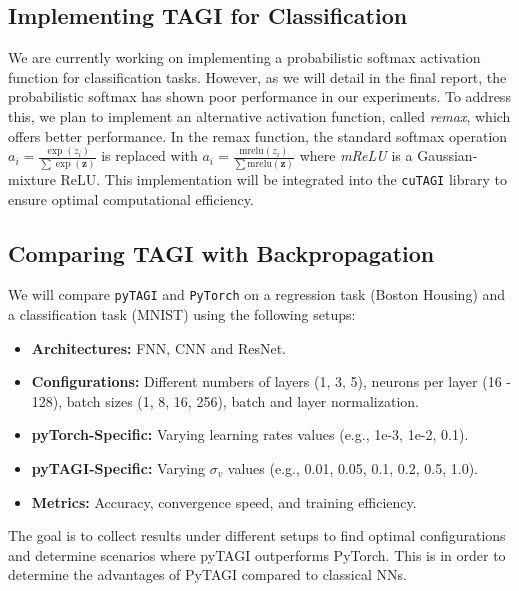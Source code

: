\documentclass[12pt]{article}
\begin{document}
\subsection*{Implementing TAGI for Classification}
We are currently working on implementing a probabilistic softmax activation function for classification tasks. However, as we will detail in the final report, the probabilistic softmax has shown poor performance in our experiments. To address this, we plan to implement an alternative activation function, called \textit{remax}, which offers better performance. In the remax function, the standard softmax operation $a_i = \frac{\exp(z_i)}{\sum \exp(\mathbf{z})}$ is replaced with $a_i = \frac{\text{mrelu}(z_i)}{\sum \text{mrelu}(\mathbf{z})}$ where \textit{mReLU} is a Gaussian-mixture ReLU. This implementation will be integrated into the \texttt{cuTAGI} \cite{cutagi2022} library to ensure optimal computational efficiency.


\subsection*{Comparing TAGI with Backpropagation}
We will compare \texttt{pyTAGI} and \texttt{PyTorch} on a regression task (Boston Housing) and a classification task (MNIST) using the following setups:
\begin{itemize}
\item \textbf{Architectures:} FNN, CNN and ResNet.
\item \textbf{Configurations:} Different numbers of layers (1, 3, 5), neurons per layer (16 - 128), batch sizes (1, 8, 16, 256), batch and layer normalization.
\item \textbf{pyTorch-Specific:} Varying learning rates values (e.g., 1e-3, 1e-2, 0.1).
\item \textbf{pyTAGI-Specific:} Varying $\sigma_v$ values (e.g., 0.01, 0.05, 0.1, 0.2, 0.5, 1.0).
\item \textbf{Metrics:} Accuracy, convergence speed, and training efficiency.
\end{itemize}
The goal is to collect results under different setups to find optimal configurations and determine scenarios where pyTAGI outperforms PyTorch. This is in order to determine the advantages of PyTAGI compared to classical NNs.




\end{document}

